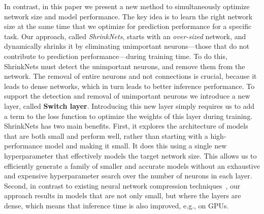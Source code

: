 In contrast, in this paper we present a new method to simultaneously optimize
 network size and model performance. The key idea is to learn the right
network size at the same time that we optimize for prediction performance for a
specific task. Our approach, called {\it ShrinkNets}, starts with an {\it
over-sized} network, and dynamically shrinks it by eliminating unimportant
neurons---those that do not contribute to prediction performance---during
training time. To do this, ShrinkNets must detect the unimportant neurons, and
remove them from the network. The
removal of entire neurons and not connections is crucial, because it leads to
dense networks, which in turn leads to better inference performance. To support the
detection and removal of unimportant neurons we introduce a new layer, called
\textbf{Switch layer}. Introducing this new layer simply requires us to
add a term to the
loss function to optimize the weights of this layer during training. ShrinkNets has
two main benefits. First, it explores the architecture of models that are both
small and perform well, rather than starting with a high-performance model and
making it small.  It does this using a single new hyperparameter that effectively 
models the target network size.  This allows us to efficiently generate a family of smaller and
accurate models without an exhaustive and expensive hyperparameter search over
the number of neurons in each layer.  Second, in contrast to existing neural
network compression techniques~\cite{Aghasi2016,han2015deepcompression}, our
approach results in models that are not only small, but where the layers are
dense, which means that inference time is also improved, e.g., on GPUs.





